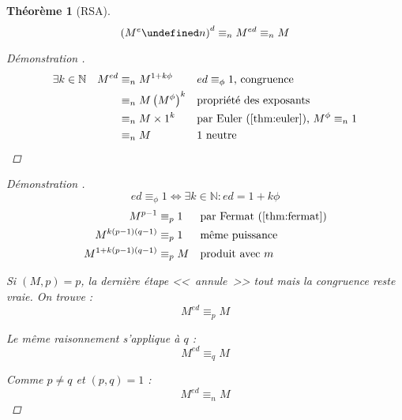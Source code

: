 \documentclass[11pt,twocolumn]{article}
\let\mod\undefined
\DeclareMathOperator{\mod}{mod}
\theoremstyle{plain}
\newtheorem{thm}{Théorème}
\newcommand{\esN}{\mathbb{N}} %
\newcommand{\dbi}{\Longleftrightarrow}
\newenvironment{cproof}[1]{\begin{proof}[Démonstration \cite{#1}]}{\end{proof}}
\begin{document}
\begin{thm}[RSA]
	\[
		\left(M^e \mod n\right)^d \equiv_n M^{ed} \equiv_n M
	\]
	\begin{cproof}{Buys}
		\begin{align*}
			\exists k \in \esN \quad M^{ed}
			&\equiv_n M^{1+k\phi}
				&& ed\equiv_\phi1 \text{, congruence} \\
			&\equiv_n M\left(M^\phi\right)^k
				&& \text{propriété des exposants} \\
			&\equiv_n M \times 1^k
				&& \text{par Euler (\ref{thm:euler}), } M^\phi\equiv_n 1 \\
			&\equiv_n M
				&& \text{1 neutre}
		\end{align*}
	\end{cproof}
	\begin{cproof}{hac} ~
		\[
			ed\equiv_\phi1 \dbi \exists k \in \esN : ed=1+k\phi
		\]
		\begin{align*}
			M^{p-1} &\equiv_p 1
				&& \text{par Fermat (\ref{thm:fermat})} \\
			M^{k\left(p-1\right)\left(q-1\right)} &\equiv_p 1
				&& \text{même puissance} \\
			M^{1+k\left(p-1\right)\left(q-1\right)} &\equiv_p M
				&& \text{produit avec }m
		\end{align*}

		Si $(M,p)=p$, la dernière étape <<~annule~>> tout
		mais la congruence reste vraie. On trouve : \[
			M^{ed} \equiv_p M
		\]

		Le même raisonnement s'applique à $q$ : \[
			M^{ed} \equiv_q M
		\]

		Comme $p \neq q$ et $(p,q)=1$ : \[
			M^{ed} \equiv_n M
		\]
	\end{cproof}
\end{thm}
\end{document}
